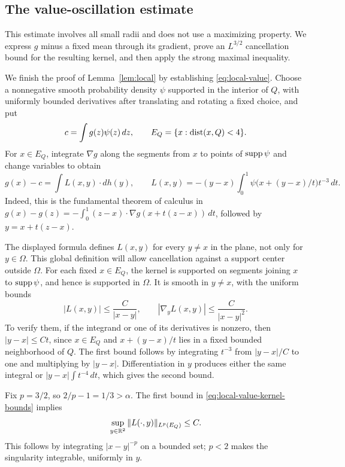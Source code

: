 \subsection{The value-oscillation estimate}

This estimate involves all small radii and does not use a maximizing
property. We express $g$ minus a fixed mean through its gradient,
prove an $L^{3/2}$ cancellation bound for the resulting kernel, and
then apply the strong maximal inequality.

We finish the proof of Lemma~\ref{lem:local} by establishing
\eqref{eq:local-value}. Choose a nonnegative smooth probability
density $\psi$ supported in the interior of $Q$, with uniformly
bounded derivatives after translating and rotating a fixed choice,
and put
\[
c=\int g(z)\psi(z)\,dz,
\qquad E_Q=\{x:\operatorname{dist}(x,Q)<4\}.
\]
For $x\in E_Q$, integrate $\nabla g$ along the segments from $x$
to points of $\operatorname{supp}\psi$ and change variables to obtain
\begin{equation}\label{eq:local-value-kernel}
g(x)-c=\int L(x,y)\cdot dh(y),
\qquad
L(x,y)=-(y-x)\int_0^1
              \psi\bigl(x+(y-x)/t\bigr)t^{-3}\,dt.
\end{equation}
Indeed, this is the fundamental theorem of calculus in
$g(x)-g(z)=-\int_0^1(z-x)\cdot\nabla g(x+t(z-x))\,dt$,
followed by $y=x+t(z-x)$.

The displayed formula defines $L(x,y)$ for every $y\ne x$ in
the plane, not only for $y\in\Omega$. This global definition will
allow cancellation against a support center outside $\Omega$.
For each fixed $x\in E_Q$, the kernel is supported on segments
joining $x$ to $\operatorname{supp}\psi$, and hence is supported in $\Omega$.
It is smooth in $y\ne x$, with the uniform bounds
\begin{equation}\label{eq:local-value-kernel-bounds}
|L(x,y)|\le\frac{C}{|x-y|},
\qquad |\nabla_yL(x,y)|\le\frac{C}{|x-y|^2}.
\end{equation}
To verify them, if the integrand or one of its derivatives is
nonzero, then $|y-x|\le Ct$, since $x\in E_Q$ and
$x+(y-x)/t$ lies in a fixed bounded neighborhood of $Q$.
The first bound follows by integrating $t^{-3}$ from
$|y-x|/C$ to one and multiplying by $|y-x|$. Differentiation in
$y$ produces either the same integral or
$|y-x|\int t^{-4}\,dt$, which gives the second bound.

Fix $p=3/2$, so $2/p-1=1/3>\alpha$. The first bound in
\eqref{eq:local-value-kernel-bounds} implies
\begin{equation}\label{eq:local-kernel-lp}
\sup_{y\in\mathbb R^2}\|L(\cdot,y)\|_{L^p(E_Q)}\le C.
\end{equation}
This follows by integrating $|x-y|^{-p}$ on a bounded set;
$p<2$ makes the singularity integrable, uniformly in $y$.

